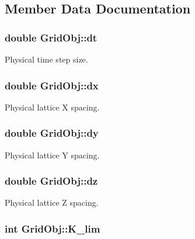 \subsection{Member Data Documentation}
\subsubsection[{\texorpdfstring{dt}{dt}}]{\setlength{\rightskip}{0pt plus 5cm}double Grid\+Obj\+::dt}\hypertarget{class_grid_obj_afd504b39f12eb0a237bc6313de94e094}{}\label{class_grid_obj_afd504b39f12eb0a237bc6313de94e094}


Physical time step size. 

\subsubsection[{\texorpdfstring{dx}{dx}}]{\setlength{\rightskip}{0pt plus 5cm}double Grid\+Obj\+::dx}\hypertarget{class_grid_obj_adbd4b9afbd8cf7bb2ccb48e7c5150f6d}{}\label{class_grid_obj_adbd4b9afbd8cf7bb2ccb48e7c5150f6d}


Physical lattice X spacing. 

\subsubsection[{\texorpdfstring{dy}{dy}}]{\setlength{\rightskip}{0pt plus 5cm}double Grid\+Obj\+::dy}\hypertarget{class_grid_obj_a62b3a2ed35439f36591740d762f6e7a1}{}\label{class_grid_obj_a62b3a2ed35439f36591740d762f6e7a1}


Physical lattice Y spacing. 

\subsubsection[{\texorpdfstring{dz}{dz}}]{\setlength{\rightskip}{0pt plus 5cm}double Grid\+Obj\+::dz}\hypertarget{class_grid_obj_a94a497f1cd79b35741843fcd3817c18f}{}\label{class_grid_obj_a94a497f1cd79b35741843fcd3817c18f}


Physical lattice Z spacing. 

\subsubsection[{\texorpdfstring{K\+\_\+lim}{K_lim}}]{\setlength{\rightskip}{0pt plus 5cm}int Grid\+Obj\+::\+K\+\_\+lim}\hypertarget{class_grid_obj_aaccc404f2fbdbaef8c5dd134f7d9e17f}{}\label{class_grid_obj_aaccc404f2fbdbaef8c5dd134f7d9e17f}


